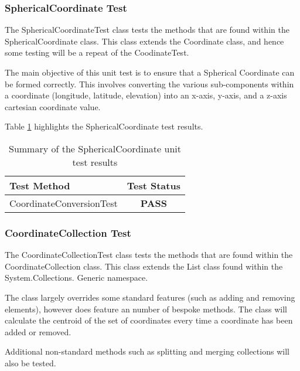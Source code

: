 \subsubsection{SphericalCoordinate Test}

The {\ttfamily SphericalCoordinateTest} class tests the methods that are 
found within the SphericalCoordinate class. This class extends the Coordinate 
class, and hence some testing will be a repeat of the {\ttfamily CoodinateTest}.

The main objective of this unit test is to ensure that a Spherical Coordinate 
can be formed correctly. This involves converting the various sub-components 
within a coordinate (longitude, latitude, elevation) into an x-axis, y-axis,
and a z-axis cartesian coordinate value.

Table \ref{tab:spherical_coordinate_test} highlights the SphericalCoordinate test results.

\begin{table}[h]
  \centering
  \begin{tabular}{|l|c|}
    \hline
    {\bfseries Test Method}  & {\bfseries Test Status} \\ 
    \hline
    CoordinateConversionTest & {\bfseries \color{OliveGreen} PASS} \\
    \hline
  \end{tabular}
  \caption[Summary of the SphericalCoordinate unit test results]
          {Summary of the SphericalCoordinate unit test results}
  \label{tab:spherical_coordinate_test}
\end{table}


\subsubsection{CoordinateCollection Test}

The {\ttfamily CoordinateCollectionTest} class tests the methods that are 
found within the CoordinateCollection class. This class extends the List 
class found within the {\ttfamily System.Collections. Generic} namespace.

The class largely overrides some standard features (such as adding and removing 
elements), however does feature an number of bespoke methods. The class will 
calculate the centroid of the set of coordinates every time a coordinate has 
been added or removed.

Additional non-standard methods such as splitting and merging collections will 
also be tested.

